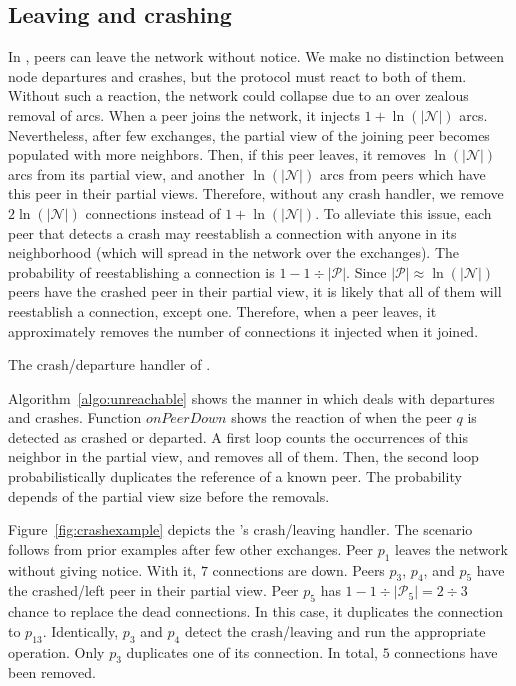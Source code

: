 \subsection{Leaving and crashing}
\label{subsec:leaving}

In \SPRAY, peers can leave the network without notice. We make no
distinction between node departures and crashes, but the protocol must
react to both of them. Without such a reaction, the network could
collapse due to an over zealous removal of arcs. When a peer joins the
network, it injects $1+\ln(|\mathcal{N}|)$ arcs. Nevertheless, after
few exchanges, the partial view of the joining peer becomes populated
with more neighbors. Then, if this peer leaves, it removes
$\ln(|\mathcal{N}|)$ arcs from its partial view, and another
$\ln(|\mathcal{N}|)$ arcs from peers which have this peer in their
partial views. Therefore, without any crash handler, we remove
$2\ln(|\mathcal{N}|)$ connections instead of
$1+\ln(|\mathcal{N}|)$. To alleviate this issue, each peer that
detects a crash may reestablish a connection with anyone in its
neighborhood (which will spread in the network over the
exchanges). The probability of reestablishing a connection is
$1-{1\div{|\mathcal{P}|}}$. Since ${|\mathcal{P}|}\approx
\ln(|\mathcal{N}|)$ peers have the crashed peer in their partial view,
it is likely that all of them will reestablish a connection, except
one. Therefore, when a peer leaves, it approximately removes the
number of connections it injected when it joined.

\begin{algorithm}[h]
  
  \caption{\label{algo:unreachable}The crash/departure handler of \SPRAY.}
\end{algorithm}

Algorithm~\ref{algo:unreachable} shows the manner in which \SPRAY deals with
departures and crashes.  Function $onPeerDown$ shows the reaction of \SPRAY
when the peer $q$ is detected as crashed or departed. A first loop counts the
occurrences of this neighbor in the partial view, and removes all of
them. Then, the second loop probabilistically duplicates the reference of a
known peer. The probability depends of the partial view size before the
removals.

Figure~\ref{fig:crashexample} depicts the \SPRAY's crash/leaving handler. The
scenario follows from prior examples after few other exchanges. Peer $p_1$
leaves the network without giving notice. With it, $7$ connections are
down. Peers $p_3$, $p_4$, and $p_5$ have the crashed/left peer in their partial
view. Peer $p_5$ has $1-{1\div{|\mathcal{P}_5|}}={2\div{3}}$ chance to replace
the dead connections. In this case, it duplicates the connection to
$p_{13}$. Identically, $p_3$ and $p_4$ detect the crash/leaving and run the
appropriate operation. Only $p_3$ duplicates one of its connection. In total,
$5$ connections have been removed.

